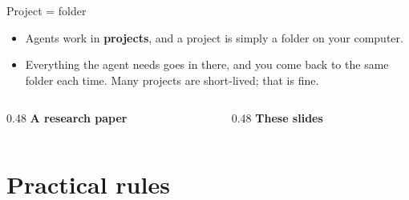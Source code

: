\documentclass[aspectratio=169,11pt]{beamer}
\begin{document}
\begin{frame}{Project = folder}
  \label{folder}
  \begin{itemize}
    \item Agents work in \textbf{projects}, and a project is simply a folder on your computer.
    \item Everything the agent needs goes in there, and you come back to the same folder each time. Many projects are short-lived; that is fine.
  \end{itemize}
  \vspace{0.3em}
  \begin{columns}[T]
    \begin{column}{0.48\textwidth}
      \textbf{A research paper}\par\vspace{0.3em}
      
    \end{column}
    \begin{column}{0.48\textwidth}
      \textbf{These slides}\par\vspace{0.3em}
      
    \end{column}
  \end{columns}
\end{frame}

\section{Practical rules}
\end{document}
